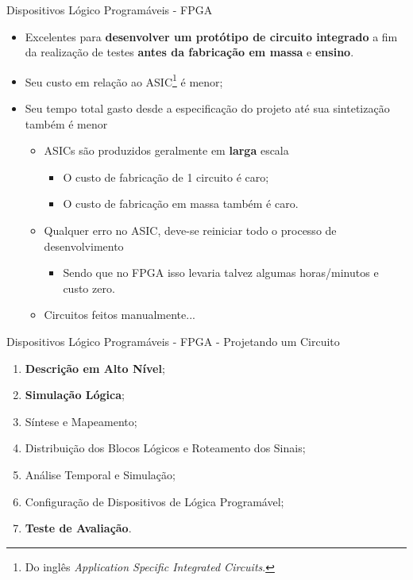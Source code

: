 	\begin{frame}{Dispositivos Lógico Programáveis - FPGA}
		\begin{itemize}
			\setlength\itemsep{1.6em}

			\item Excelentes para \textbf{desenvolver um protótipo de circuito integrado} a fim da realização de testes \textbf{antes da fabricação em massa} \cite{Skliarova2003} e \textbf{ensino}.

			\item Seu custo em relação ao ASIC\footnote{Do inglês \textit{Application Specific Integrated Circuits}.} é menor;

			\item Seu tempo total gasto desde a especificação do projeto até sua sintetização também é menor
			\begin{itemize}
				\setlength\itemsep{0.5em}

				\item ASICs são produzidos geralmente em \textbf{larga} escala
				\begin{itemize}
					\item O custo de fabricação de 1 circuito é caro;
					\item O custo de fabricação em massa também é caro.
				\end{itemize}

				\item Qualquer erro no ASIC, deve-se reiniciar todo o processo de desenvolvimento
				\begin{itemize}
					\item Sendo que no FPGA isso levaria talvez algumas horas/minutos e custo zero.
				\end{itemize}

				\item Circuitos feitos manualmente...
			\end{itemize}

		\end{itemize}
	\end{frame}


	\begin{frame}{Dispositivos Lógico Programáveis - FPGA - Projetando um Circuito}
		\begin{enumerate}
			\setlength\itemsep{1em}
			\item \textbf{Descrição em Alto Nível};
			\item \textbf{Simulação Lógica};
			\pause
			\item Síntese e Mapeamento;
			\item Distribuição dos Blocos Lógicos e Roteamento dos Sinais;
			\item Análise Temporal e Simulação;
			\pause
			\item Configuração de Dispositivos de Lógica Programável;
			\pause
			\item \textbf{Teste de Avaliação}.
		\end{enumerate}
	\end{frame}
